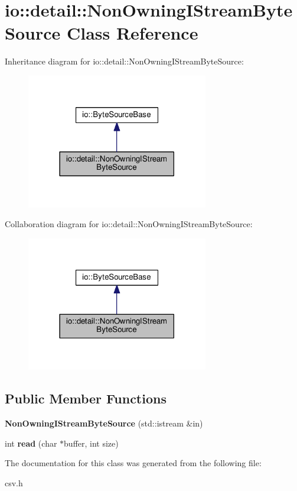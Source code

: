 \section{io\+:\+:detail\+:\+:Non\+Owning\+I\+Stream\+Byte\+Source Class Reference}
\label{classio_1_1detail_1_1_non_owning_i_stream_byte_source}


Inheritance diagram for io\+:\+:detail\+:\+:Non\+Owning\+I\+Stream\+Byte\+Source\+:\nopagebreak
\begin{figure}[H]
\begin{center}
\leavevmode
\includegraphics[width=225pt]{classio_1_1detail_1_1_non_owning_i_stream_byte_source__inherit__graph}
\end{center}
\end{figure}


Collaboration diagram for io\+:\+:detail\+:\+:Non\+Owning\+I\+Stream\+Byte\+Source\+:\nopagebreak
\begin{figure}[H]
\begin{center}
\leavevmode
\includegraphics[width=225pt]{classio_1_1detail_1_1_non_owning_i_stream_byte_source__coll__graph}
\end{center}
\end{figure}
\subsection*{Public Member Functions}
\begin{DoxyCompactItemize}
\item 
{\bfseries Non\+Owning\+I\+Stream\+Byte\+Source} (std\+::istream \&in)\label{classio_1_1detail_1_1_non_owning_i_stream_byte_source_aacb55ba2f52ba1c30810697d6aa92169}

\item 
int {\bfseries read} (char $\ast$buffer, int size)\label{classio_1_1detail_1_1_non_owning_i_stream_byte_source_ac7b1968c8314896d7ec0ebb97fdda30d}

\end{DoxyCompactItemize}


The documentation for this class was generated from the following file\+:\begin{DoxyCompactItemize}
\item 
csv.\+h\end{DoxyCompactItemize}
